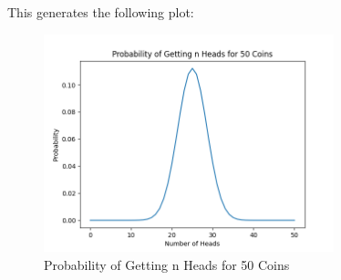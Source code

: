 \documentclass[a4paper,floatfix,nofootinbib]{article}
\begin{document}
\newpage

This generates the following plot:
\begin{figure}[hH]
    \centering
    \includegraphics[width=0.75\textwidth]{Figure_1.png}
    \caption{Probability of Getting n Heads for 50 Coins}
\end{figure}
\end{document}
